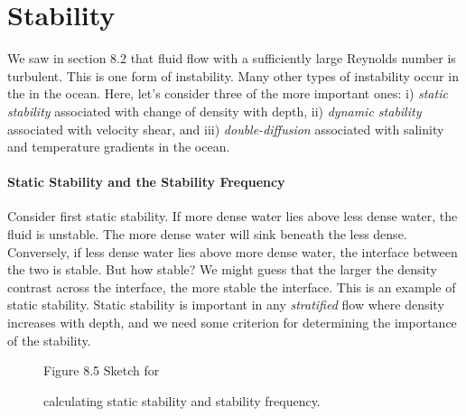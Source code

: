 \section{Stability}
We saw in section 8.2 that fluid flow with a sufficiently large Reynolds number
is turbulent. This is one form of instability. Many other types of instability
occur in the in the ocean. Here, let's consider three of the more important ones:
i) \textit{static stability} associated with change
of density with depth, ii) \textit{dynamic
stability} associated with velocity shear, and iii)
\textit{double-diffusion} associated with salinity and
temperature gradients in the ocean.

\paragraph{Static Stability and the Stability Frequency} Consider first static
stability. If more dense water lies above less dense water, the fluid is
unstable. The more dense water will sink beneath the less dense. Conversely, if less
dense water lies above more dense water, the interface between the two is stable.
But how stable? We might guess that the larger the density contrast across the
interface, the more stable the interface. This is an example of static stability.
Static stability is important in any \textit{stratified} flow
where density increases with depth, and we need some criterion for determining the
importance of the stability.

\begin{figure}[b!]
\vspace{1ex}
\centering
\footnotesize
Figure 8.5 Sketch for \rule{0mm}{4ex}calculating static stability
and stability frequency.

\label{fig:stabilitysketch}
\end{figure}

